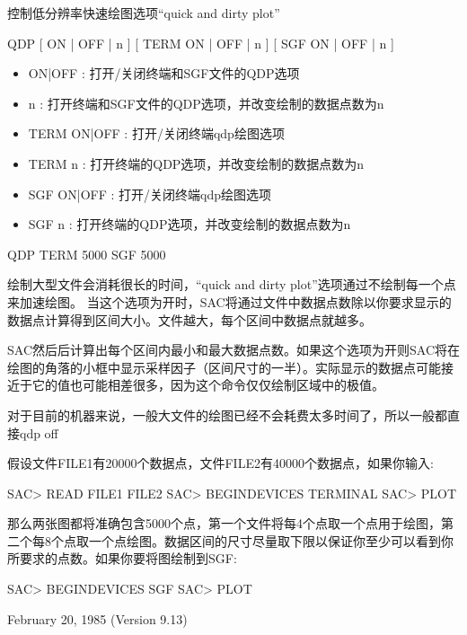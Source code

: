 \label{cmd:qdp}

控制低分辨率快速绘图选项``quick and dirty plot''

QDP [ ON | OFF | n ] [ TERM ON | OFF | n ] [ SGF ON | OFF | n ]

\begin{itemize}
\item ON|OFF : 打开/关闭终端和SGF文件的QDP选项 
\item n : 打开终端和SGF文件的QDP选项，并改变绘制的数据点数为n 
\item TERM ON|OFF : 打开/关闭终端qdp绘图选项 
\item TERM n : 打开终端的QDP选项，并改变绘制的数据点数为n 
\item SGF ON|OFF : 打开/关闭终端qdp绘图选项 
\item SGF n : 打开终端的QDP选项，并改变绘制的数据点数为n 
\end{itemize}

QDP TERM 5000 SGF 5000

绘制大型文件会消耗很长的时间，``quick and dirty plot''选项通过不绘制每一个点来加速绘图。
当这个选项为开时，SAC将通过文件中数据点数除以你要求显示的数据点计算得到区间大小。文件越大，每个区间中数据点就越多。

SAC然后后计算出每个区间内最小和最大数据点数。如果这个选项为开则SAC将在绘图的角落的小框中显示采样因子（区间尺寸的一半）。实际显示的数据点可能接近于它的值也可能相差很多，因为这个命令仅仅绘制区域中的极值。

对于目前的机器来说，一般大文件的绘图已经不会耗费太多时间了，所以一般都直接qdp off

假设文件FILE1有20000个数据点，文件FILE2有40000个数据点，如果你输入:
\begin{SACCode}
SAC> READ FILE1 FILE2
SAC> BEGINDEVICES TERMINAL
SAC> PLOT
\end{SACCode}
那么两张图都将准确包含5000个点，第一个文件将每4个点取一个点用于绘图，第二个每8个点取一个点绘图。数据区间的尺寸尽量取下限以保证你至少可以看到你所要求的点数。如果你要将图绘制到SGF:
\begin{SACCode}
SAC> BEGINDEVICES SGF
SAC> PLOT
\end{SACCode}

February 20, 1985 (Version 9.13)
